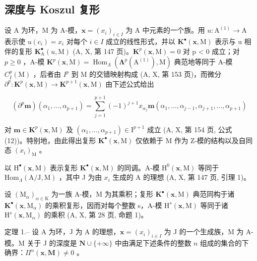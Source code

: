 \subsection{深度与 Koszul 复形}

设 A 为环，M 为 A-模，\(\mathbf{x} = (x_i)_{i \in I}\) 为 A 中元素的一个族。用 \(u : \mathrm{A}^{(1)} \to \mathrm{A}\) 表示使 \(u(c_i) = x_i\) 对每个 \(i \in I\) 成立的线性形式，并以 \(\mathbf{K}^{\bullet}(\mathbf{x}, \mathrm{M})\) 表示与 u 相伴的复形 \(\mathbf{K}_{\mathrm{A}}^{\bullet}(u, \mathrm{M})\) (A, X, 第 147 页)。\(\mathbf{K}^p(\mathbf{x}, \mathrm{M}) = 0\) 对 p \textless{} 0 成立；对 \(p \geqslant 0\) ，A-模 \(\mathbf{K}^p(\mathbf{x}, \mathrm{M}) = \operatorname{Hom}_{\Lambda} (\boldsymbol{\Lambda}^p(\mathrm{A}^{(1)}), \mathrm{M})\) 典范地等同于 A-模 \(C_I^p(\mathrm{M})\) ，后者由 \(I^p\) 到 M 的交错映射构成 (A, X, 第 153 页)，而微分 \(\partial^p : \mathbf{K}^p(\mathbf{x}, \mathrm{M}) \longrightarrow \mathbf{K}^{p+1}(\mathbf{x}, \mathrm{M})\) 由下述公式给出

\[
\left(\partial^ {p} \boldsymbol {m}\right) \left(\alpha_ {1}, \dots , \alpha_ {p + 1}\right) = \sum_ {j = 1} ^ {p + 1} (- 1) ^ {j + 1} x _ {\alpha_ {j}} \boldsymbol {m} \left(\alpha_ {1}, \dots , \alpha_ {j - 1}, \alpha_ {j + 1}, \dots , \alpha_ {p + 1}\right)
\]

对 \(\boldsymbol{m} \in \mathbf{K}^{p}(\mathbf{x}, \mathrm{M})\) 及 \((\alpha_{1}, \ldots, \alpha_{p+1}) \in \mathrm{I}^{p+1}\) 成立 (A, X, 第 154 页, 公式 (12))。特别地，由此得出复形 \(\mathbf{K}^{\bullet}(\mathbf{x}, \mathrm{M})\) 仅依赖于 M 作为 Z-模的结构以及自同态 \((x_{i})_{\mathrm{M}}\) 。

以 \(\mathrm{H}^{\bullet}(\mathbf{x},\mathrm{M})\) 表示复形 \(\mathbf{K}^{\bullet}(\mathbf{x},\mathrm{M})\) 的同调。A-模 \(\mathrm{H}^{0}(\mathbf{x},\mathrm{M})\) 等同于 \(\mathrm{Hom}_{\Lambda}(\mathrm{A}/\mathrm{J},\mathrm{M})\) ，其中 J 为由 \(x_{i}\) 生成的 A 的理想 (A, X, 第 147 页, 引理 1)。

设 \((\mathrm{M}_{\alpha})_{\alpha\in\mathrm{K}}\) 为一族 A-模，M 为其乘积；复形 \(\mathbf{K}^{\bullet}(\mathbf{x},\mathrm{M})\) 典范同构于诸 \(\mathbf{K}^{\bullet}(\mathbf{x},\mathrm{M}_{\alpha})\) 的乘积复形，因而对每个整数 s，A-模 \(\mathrm{H}^{s}(\mathbf{x},\mathrm{M})\) 等同于诸 \(\mathrm{H}^{s}(\mathbf{x},\mathrm{M}_{\alpha})\) 的乘积 (A, X, 第 28 页, 命题 1)。

定理 1.-- 设 A 为环，J 为 A 的理想，\(\mathbf{x} = (x_i)_{i \in I}\) 为 J 的一个生成族，M 为 A-模。M 关于 J 的深度是 \(\mathbf{N} \cup \{+\infty\}\) 中由满足下述条件的整数 \(n\) 组成的集合的下确界：\(\Pi^n(\mathbf{x}, \mathbf{M}) \neq 0\) 。


